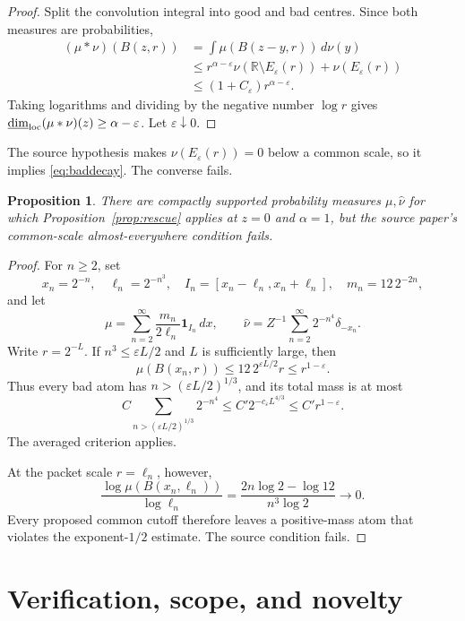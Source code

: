 \documentclass[11pt]{article}
\newtheorem{proposition}{Proposition}
\newcommand{\ldim}{\underline{\operatorname{dim}}_{\rm loc}}
\begin{document}
\begin{proof}
Split the convolution integral into good and bad centres.  Since both
measures are probabilities,
\begin{align*}
 (\mu*\nu)(B(z,r))
 &=\int\mu(B(z-y,r))\,d\nu(y)\\
 &\leq r^{\alpha-\varepsilon}
      \nu(\mathbb R\setminus E_\varepsilon(r))
      +\nu(E_\varepsilon(r))\\
 &\leq(1+C_\varepsilon)r^{\alpha-\varepsilon}.
\end{align*}
Taking logarithms and dividing by the negative number $\log r$ gives
$\ldim(\mu*\nu)(z)\geq\alpha-\varepsilon$.  Let
$\varepsilon\downarrow0$.
\end{proof}

The source hypothesis makes $\nu(E_\varepsilon(r))=0$ below a common scale,
so it implies \eqref{eq:baddecay}.  The converse fails.

\begin{proposition}\label{prop:strict}
There are compactly supported probability measures $\mu,\widehat\nu$ for
which Proposition~\ref{prop:rescue} applies at $z=0$ and $\alpha=1$, but the
source paper's common-scale almost-everywhere condition fails.
\end{proposition}

\begin{proof}
For $n\geq2$, set
\[
 x_n=2^{-n},\quad \ell_n=2^{-n^3},\quad
 I_n=[x_n-\ell_n,x_n+\ell_n],\quad m_n=12\,2^{-2n},
\]
and let
\[
 \mu=\sum_{n=2}^\infty
 \frac{m_n}{2\ell_n}\mathbf1_{I_n}\,dx,
 \qquad
 \widehat\nu=Z^{-1}\sum_{n=2}^\infty2^{-n^4}\delta_{-x_n}.
\]
Write $r=2^{-L}$.  If $n^3\leq\varepsilon L/2$ and $L$ is sufficiently
large, then
\[
 \mu(B(x_n,r))\leq12\,2^{\varepsilon L/2}r
 \leq r^{1-\varepsilon}.
\]
Thus every bad atom has
$n>(\varepsilon L/2)^{1/3}$, and its total mass is at most
\[
 C\sum_{n>(\varepsilon L/2)^{1/3}}2^{-n^4}
 \leq C'2^{-c_\varepsilon L^{4/3}}
 \leq C'r^{1-\varepsilon}.
\]
The averaged criterion applies.

At the packet scale $r=\ell_n$, however,
\[
 \frac{\log\mu(B(x_n,\ell_n))}{\log\ell_n}
 =\frac{2n\log2-\log12}{n^3\log2}\longrightarrow0.
\]
Every proposed common cutoff therefore leaves a positive-mass atom that
violates the exponent-$1/2$ estimate.  The source condition fails.
\end{proof}

\section{Verification, scope, and novelty}
\end{document}
